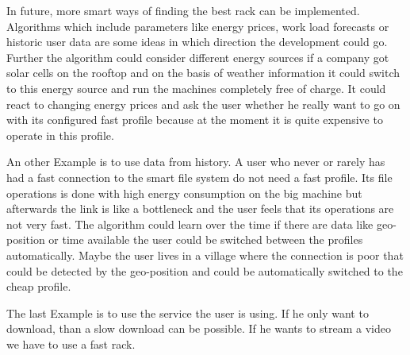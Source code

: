 \label{sec:outlook}



In future, more smart ways of finding the best rack can be implemented. Algorithms which include parameters like energy prices, work load forecasts or historic user data are some ideas in which direction the development could go. Further the algorithm could consider different energy sources if a company got solar cells on the rooftop and on the basis of weather information it could switch to this energy source and run the machines completely free of charge. It could react to changing energy prices and ask the user whether he really want to go on with its configured fast profile because at the moment it is quite expensive to operate in this profile.

An other Example is to use data from history. A user who never or rarely has had a fast connection to the smart file system do not need a fast profile. Its file operations is done with high energy consumption on the big machine but afterwards the link is like a bottleneck and the user feels that its operations are not very fast. The algorithm could learn over the time if there are data like geo-position or time available the user could be switched between the profiles automatically. Maybe the user lives in a village where the connection is poor that could be detected by the geo-position and could be automatically switched to the cheap profile.

The last Example is to use the service the user is using. If he only want to download, than a slow download can be possible. If he wants to stream a video we have to use a fast rack.






